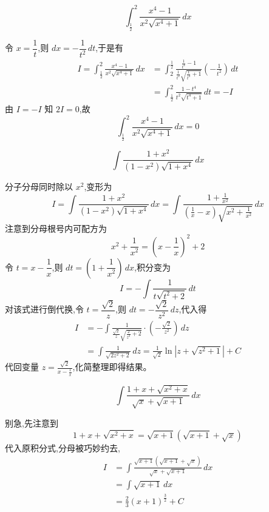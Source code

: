 \begin{questions}
    \question 
    \[
    \int_{\frac{1}{2}}^{2} \frac{x^4-1}{x^2\sqrt{x^4+1}} \, dx
    \]
    \begin{solution}
    令 $x = \dfrac{1}{t}$,则 $dx = -\dfrac{1}{t^2} \, dt$,于是有
    \begin{align*}
    I =\int_{\frac{1}{2}}^{2} \frac{x^4-1}{x^2\sqrt{x^4+1}} \, dx &= \int_{2}^{\frac{1}{2}} \frac{\frac{1}{t^4}-1}{\frac{1}{t^2}\sqrt{\frac{1}{t^4}+1}} \left(-\frac{1}{t^2}\right) \, dt \\
    &= \int_{\frac{1}{2}}^{2} \frac{1-t^4}{t^2\sqrt{t^4+1}} \, dt = -I
    \end{align*}
    由 $I = -I$ 知 $2I = 0$,故
    \[
    \int_{\frac{1}{2}}^{2} \frac{x^4-1}{x^2\sqrt{x^4+1}} \, dx = 0
    \]
    \end{solution}

    \question 
    \[
    \int \frac{1+x^2}{(1-x^2)\sqrt{1+x^4}} \, dx
    \]
    \begin{solution}
        分子分母同时除以 $x^2$,变形为
        \[
        I = \int \frac{1+x^2}{(1-x^2)\sqrt{1+x^4}} \, dx = \int \frac{1+\frac{1}{x^2}}{(\frac{1}{x}-x)\sqrt{x^2+\frac{1}{x^2}}} \, dx
        \]
        注意到分母根号内可配方为 
        \[
        x^2+\frac{1}{x^2} = \left(x-\frac{1}{x}\right)^2+2
        \]
        令 $t = x-\dfrac{1}{x}$,则 $dt = \left(1+\dfrac{1}{x^2}\right) \, dx$,积分变为
        \[
        I = -\int \frac{1}{t\sqrt{t^2+2}} \, dt
        \]
        对该式进行倒代换,令 $t = \dfrac{\sqrt{2}}{z}$,则 $dt = -\dfrac{\sqrt{2}}{z^2} \, dz$,代入得
        \begin{align*}
        I &= -\int \frac{1}{\frac{\sqrt{2}}{z}\sqrt{\frac{2}{z^2}+2}} \cdot \left(-\frac{\sqrt{2}}{z^2}\right) \, dz \\
        &= \int \frac{1}{\sqrt{2z^2+2}} \, dz = \frac{1}{\sqrt{2}} \ln|z+\sqrt{z^2+1}| + C
        \end{align*}
        代回变量 $z = \frac{\sqrt{2}}{x-\frac{1}{x}}$,化简整理即得结果。
    \end{solution}

    \question 
    \[
    \int \frac{1+x+\sqrt{x^2+x}}{\sqrt{x}+\sqrt{x+1}} \, dx 
    \]
    \begin{solution}
        别急,先注意到
        \[
        1+x+\sqrt{x^2+x} = \sqrt{x+1} (\sqrt{x+1} + \sqrt{x})
        \]
        代入原积分式,分母被巧妙约去,
        \begin{align*}
        I &= \int \frac{\sqrt{x+1} (\sqrt{x+1} + \sqrt{x})}{\sqrt{x}+\sqrt{x+1}} \, dx \\
        &= \int \sqrt{x+1} \, dx \\
        &= \frac{2}{3}(x+1)^{\frac{3}{2}} + C
        \end{align*}
    \end{solution}


\end{questions}
